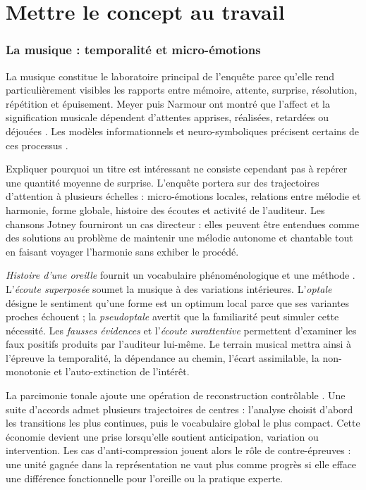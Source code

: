 \documentclass[11pt,a4paper]{article}
\begin{document}
\part{Mettre le concept au travail}

\section{La musique : temporalité et micro-émotions}

La musique constitue le laboratoire principal de l'enquête parce qu'elle rend
particulièrement visibles les rapports entre mémoire, attente, surprise,
résolution, répétition et épuisement. Meyer puis Narmour ont montré que l'affect
et la signification musicale dépendent d'attentes apprises, réalisées, retardées
ou déjouées
\parencite{meyer1956emotion,narmour1990basic,narmour1992complexity}. Les modèles
informationnels et neuro-symboliques précisent certains de ces processus
\parencite{abdallah2009information,berger1999expectations,gang1999unified}.

Expliquer pourquoi un titre est intéressant ne consiste cependant pas à repérer
une quantité moyenne de surprise. L'enquête portera sur des trajectoires
d'attention à plusieurs échelles : micro-émotions locales, relations entre
mélodie et harmonie, forme globale, histoire des écoutes et activité de
l'auditeur. Les chansons Jotney fourniront un cas directeur : elles peuvent être
entendues comme des solutions au problème de maintenir une mélodie autonome et
chantable tout en faisant voyager l'harmonie sans exhiber le procédé.

\emph{Histoire d'une oreille} fournit un vocabulaire phénoménologique et une
méthode \parencite{pachet2018oreille}. L'\emph{écoute superposée} soumet la
musique à des variations intérieures. L'\emph{optale} désigne le sentiment
qu'une forme est un optimum local parce que ses variantes proches échouent ; la
\emph{pseudoptale} avertit que la familiarité peut simuler cette nécessité. Les
\emph{fausses évidences} et l'\emph{écoute surattentive} permettent d'examiner
les faux positifs produits par l'auditeur lui-même. Le terrain musical mettra
ainsi à l'épreuve la temporalité, la dépendance au chemin, l'écart assimilable,
la non-monotonie et l'auto-extinction de l'intérêt.

La parcimonie tonale ajoute une opération de reconstruction contrôlable
\parencite{pachet2026tonalparsimony}. Une suite d'accords admet plusieurs
trajectoires de centres : l'analyse choisit d'abord les transitions les plus
continues, puis le vocabulaire global le plus compact. Cette économie devient
une prise lorsqu'elle soutient anticipation, variation ou intervention. Les cas
d'anti-compression jouent alors le rôle de contre-épreuves : une unité gagnée
dans la représentation ne vaut plus comme progrès si elle efface une différence
fonctionnelle pour l'oreille ou la pratique experte.
\end{document}
